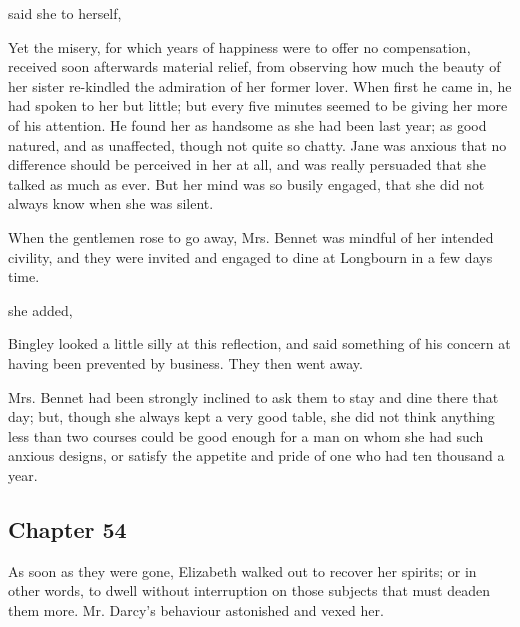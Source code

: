  said she to herself, 

Yet the misery, for which years of happiness were to offer no compensation, received soon afterwards material relief, from observing how much the beauty of her sister re-kindled the admiration of her former lover. When first he came in, he had spoken to her but little; but every five minutes seemed to be giving her more of his attention. He found her as handsome as she had been last year; as good natured, and as unaffected, though not quite so chatty. Jane was anxious that no difference should be perceived in her at all, and was really persuaded that she talked as much as ever. But her mind was so busily engaged, that she did not always know when she was silent.

When the gentlemen rose to go away, Mrs. Bennet was mindful of her intended civility, and they were invited and engaged to dine at Longbourn in a few days time.

 she added, 

Bingley looked a little silly at this reflection, and said something of his concern at having been prevented by business. They then went away.

Mrs. Bennet had been strongly inclined to ask them to stay and dine there that day; but, though she always kept a very good table, she did not think anything less than two courses could be good enough for a man on whom she had such anxious designs, or satisfy the appetite and pride of one who had ten thousand a year.

\subsection[chapter-54]{\useURL[url54][][][]\from[url54] Chapter 54}

As soon as they were gone, Elizabeth walked out to recover her spirits; or in other words, to dwell without interruption on those subjects that must deaden them more. Mr. Darcy's behaviour astonished and vexed her.

